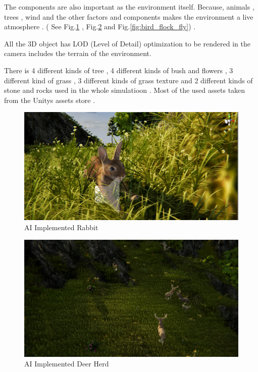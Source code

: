 The components are also important as the environment itself. Because,  animals , trees , wind and the other factors and components makes the environment a live atmosphere . ( See Fig.\ref{fig:rabbit} , Fig.\ref{fig:deer_herd} and Fig.\ref{fig:bird_flock_fly}) . 



All the 3D object has LOD (Level of Detail) optimization to be rendered in the camera includes the terrain of the environment.

There is 4 different kinds of tree , 4 different kinds of bush and flowers , 3 different kind of grass , 3 different kinds of grass texture and 2 different kinds of stone and rocks used in the whole simulatioon . Most of the used assets taken from the Unitys assets store .

\newpage

\begin{figure}[ht]
    \centering
    \includegraphics[scale=.26]{Images/rabbit_.png}
    \caption{AI Implemented Rabbit}
    \label{fig:rabbit}
\end{figure}

\begin{figure}[ht]
    \centering
    \includegraphics[scale=.285]{Images/deers_AI.png}
    \caption{AI Implemented Deer Herd}
    \label{fig:deer_herd}
\end{figure}

